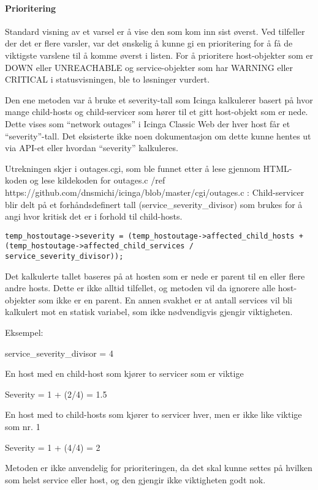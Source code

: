 \paragraph{Prioritering}

Standard visning av et varsel er å vise den som kom inn sist øverst. Ved tilfeller der det er flere varsler, var det ønskelig å kunne gi en prioritering for å få de viktigste varslene til å komme øverst i listen. For å prioritere host-objekter som er DOWN eller UNREACHABLE og service-objekter som har WARNING eller CRITICAL i statusvisningen, ble to løsninger vurdert. 

Den ene metoden var å bruke et severity-tall som Icinga kalkulerer basert på hvor mange child-hosts og child-servicer som hører til et gitt host-objekt som er nede. Dette vises som “network outages” i Icinga Classic Web der hver host får et “severity”-tall. Det eksisterte ikke noen dokumentasjon om dette kunne hentes ut via API-et eller hvordan “severity” kalkuleres. 

Utrekningen skjer i outages.cgi, som ble funnet etter å lese gjennom HTML-koden og lese kildekoden for outages.c /ref https://github.com/dnsmichi/icinga/blob/master/cgi/outages.c : 
Child-servicer blir delt på et forhåndsdefinert tall (service\_severity\_divisor) som brukes for å angi hvor kritisk det er i forhold til child-hosts.

\begin{lstlisting}
temp_hostoutage->severity = (temp_hostoutage->affected_child_hosts + (temp_hostoutage->affected_child_services / service_severity_divisor));
\end{lstlisting}

Det kalkulerte tallet baseres på at hosten som er nede er parent til en eller flere andre hosts. Dette er ikke alltid tilfellet, og metoden vil da ignorere alle host-objekter som ikke er en parent. En annen svakhet er at antall services vil bli kalkulert mot en statisk variabel, som ikke nødvendigvis gjengir viktigheten.

Eksempel:

service\_severity\_divisor = 4 

En host med en child-host som kjører to servicer som er viktige

Severity = 1 + (2/4) = 1.5

En host med to child-hosts som kjører to servicer hver, men er ikke like viktige som nr. 1

Severity = 1 + (4/4) = 2

Metoden er ikke anvendelig for prioriteringen, da det skal kunne settes på hvilken som helst service eller host, og den gjengir ikke viktigheten godt nok.     

